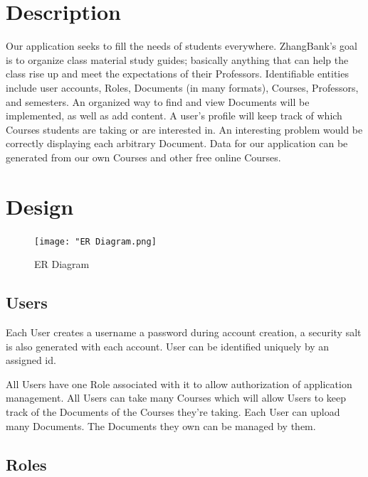 \documentclass[11pt]{article}
\title{}
\author{}
\date{\today}
\begin{document}


\tableofcontents

\pagebreak

\section{Description}
\label{sec-1}


  Our application seeks to fill the needs of students
  everywhere. ZhangBank's goal is to organize class material study
  guides; basically anything that can help the class rise up and meet
  the expectations of their Professors. Identifiable entities include
  user accounts, Roles, Documents (in many formats), Courses,
  Professors, and semesters. An organized way to find and view
  Documents will be implemented, as well as add content. A user's
  profile will keep track of which Courses students are taking or are
  interested in. An interesting problem would be correctly displaying
  each arbitrary Document. Data for our application can be generated
  from our own Courses and other free online Courses.
  
\section{Design}
\label{sec-2}


  \begin{figure}[htb]
  \centering
  \texttt{[image: "ER Diagram.png]}
  \caption{ER Diagram}
  \end{figure}
  
\subsection{Users}
\label{sec-2-1}

   
   Each User creates a username a password during account creation, a
   security salt is also generated with each account. User can be
   identified uniquely by an assigned id.

   All Users have one Role associated with it to allow authorization
   of application management.  All Users can take many Courses which
   will allow Users to keep track of the Documents of the Courses
   they're taking. Each User can upload many Documents. The Documents
   they own can be managed by them.
\subsection{Roles}
\label{sec-2-2}
\end{document}
